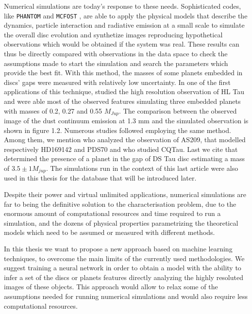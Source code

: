 \documentclass[a4paper,10pt]{report}
\begin{document}
Numerical simulations are today's response to these needs. Sophisticated codes,
 like \lstinline{PHANTOM} \citep{phantom} and \lstinline{MCFOST} \citep{mcfost1,mcfost2}, 
are able to apply the physical models that describe the dynamics, particle interaction and radiative emission at a small scale 
to simulate the overall disc evolution and synthetize images reproducing hypothetical observations which would be 
obtained if the system was real.
These results can thus be directly compared  with observations in the data 
space to check the assumptions made to start the simulation and 
search the parameters which provide the best fit.
With this method, the masses of some planets embedded 
in discs' gaps were measured with relatively low uncertainty.
In one of the first applications of this technique, \citet{Dipierro_2015} studied
the high resolution observation of HL Tau 
and were able most of the observed features 
simulating three embedded planets with masses of 0.2,  0.27  and  0.55 $M_{Jup}$.
The comparison between the observed image of the dust continuum emission at 1.3 mm and the simulated observation
is shown in figure 1.2.
Numerous studies followed employing the same method. Among them, we mention \citet{refId0} who analyzed
the observation of AS209, \citet{Toci_2019,Toci_2020} that modelled respectively HD169142 and PDS70 and 
\citet{Ubeira_Gabellini_2019} who studied CQTau.
Last we cite \citet{dstauv} that determined the
presence of a planet in the gap of DS Tau disc estimating a mass of $3.5 \pm 1 M_{jup}$. The simulations run 
in the context of this last article were also used in this thesis for the database that will be introduced later.

Despite their power and virtual unlimited applications, numerical simulations are far to being the definitive solution
to the characterisation problem, due to the enormous amount of computational resources and time 
required to run a simulation, and the dozens of physical properties parametrizing the theoretical models which need to be 
assumed or measured with different methods.

In this thesis we want to propose a new approach based on machine learning techniques, to overcome 
the main limits of the currently used methodologies. We suggest training a neural network
in order to obtain a model with the ability to infer a set of the discs or planets features directly
analyzing the highly resoluted images of these objects. This approach would allow 
to relax some of the assumptions needed for running numerical simulations and would also require 
less computational resources.
\end{document}
